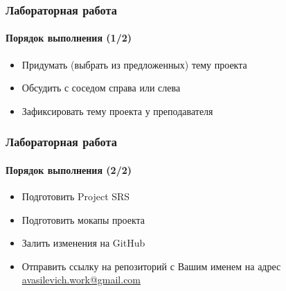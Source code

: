 \documentclass[aspectratio=169, 12pt]{beamer}
\begin{document}
\begin{frame}
    \frametitle{Лабораторная работа }
    \framesubtitle{Порядок выполнения (1/2)} \pause
    \begin{itemize}
        \item Придумать (выбрать из предложенных) тему проекта
        \item Обсудить с соседом справа или слева
        \item Зафиксировать тему проекта у преподавателя
    \end{itemize}
\end{frame}

\begin{frame}
    \frametitle{Лабораторная работа }
    \framesubtitle{Порядок выполнения (2/2)} \pause
    \begin{itemize}
        \item Подготовить Project SRS
        \item Подготовить мокапы проекта
        \item Залить изменения на GitHub
        \item Отправить ссылку на репозиторий с Вашим именем на адрес \href{mailto:avasilevich.work@gmail.com}{avasilevich.work@gmail.com}
    \end{itemize}
\end{frame}
\end{document}
